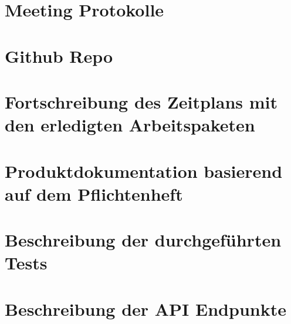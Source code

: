 \documentclass[11pt]{article}
\begin{document}
     \section{Meeting Protokolle}
     \section{Github Repo}
     \section{Fortschreibung des Zeitplans mit den erledigten Arbeitspaketen}
     \section{Produktdokumentation basierend auf dem Pflichtenheft}
     \section{Beschreibung der durchgeführten Tests}
     \section{Beschreibung der API Endpunkte}        
\end{document}
